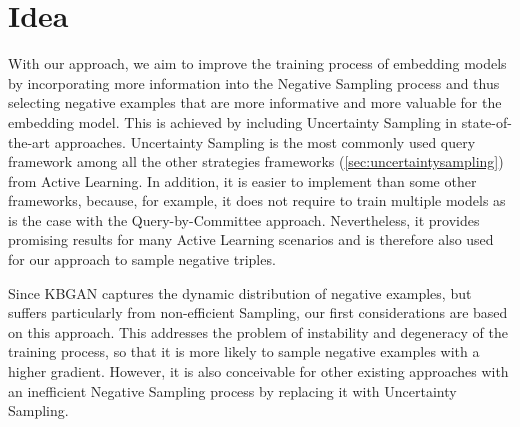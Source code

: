 \section{Idea} 
\label{sec:idea}



With our approach, we aim to improve the training process of embedding models by incorporating more information into the Negative Sampling process and thus selecting negative examples that are more informative and more valuable for the embedding model.
This is achieved by including Uncertainty Sampling in state-of-the-art approaches.
Uncertainty Sampling is the most commonly used query framework among all the other strategies frameworks (\autoref{sec:uncertaintysampling}) from Active Learning.
In addition, it is easier to implement than some other frameworks, because, for example, it does not require to train multiple models as is the case with the Query-by-Committee approach.
Nevertheless, it provides promising results for many Active Learning scenarios and is therefore also used for our approach to sample negative triples.

Since \ac{KBGAN} captures the dynamic distribution of negative examples, but suffers particularly from non-efficient Sampling, our first considerations are based on this approach.
This addresses the problem of instability and degeneracy of the training process, so that it is more likely to sample negative examples with a higher gradient.
However, it is also conceivable for other existing approaches with an inefficient Negative Sampling process by replacing it with Uncertainty Sampling.

